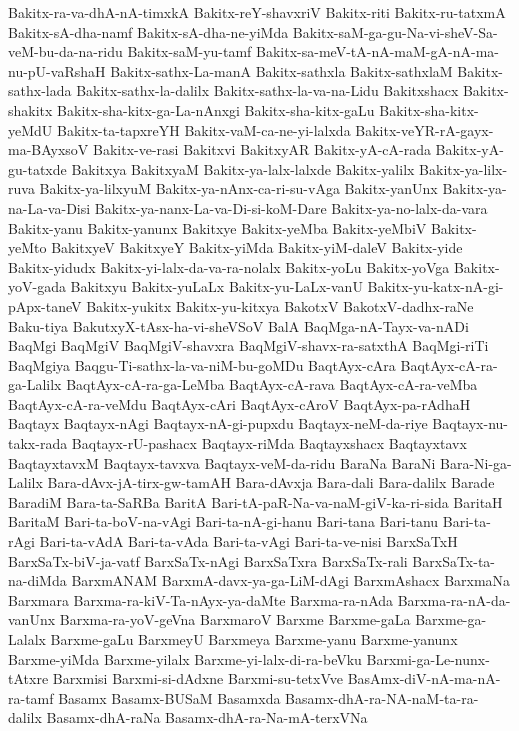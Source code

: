 {Bakitx-ra-va-dhA-nA-timxkA
Bakitx-reY-shavxriV
Bakitx-riti
Bakitx-ru-tatxmA
Bakitx-sA-dha-namf
Bakitx-sA-dha-ne-yiMda
Bakitx-saM-ga-gu-Na-vi-sheV-Sa-veM-bu-da-na-ridu
Bakitx-saM-yu-tamf
Bakitx-sa-meV-tA-nA-maM-gA-nA-ma-nu-pU-vaRshaH
Bakitx-sathx-La-manA
Bakitx-sathxla
Bakitx-sathxlaM
Bakitx-sathx-lada
Bakitx-sathx-la-dalilx
Bakitx-sathx-la-va-na-Lidu
Bakitxshacx
Bakitx-shakitx
Bakitx-sha-kitx-ga-La-nAnxgi
Bakitx-sha-kitx-gaLu
Bakitx-sha-kitx-yeMdU
Bakitx-ta-tapxreYH
Bakitx-vaM-ca-ne-yi-lalxda
Bakitx-veYR-rA-gayx-ma-BAyxsoV
Bakitx-ve-rasi
Bakitxvi
BakitxyAR
Bakitx-yA-cA-rada
Bakitx-yA-gu-tatxde
Bakitxya
BakitxyaM
Bakitx-ya-lalx-lalxde
Bakitx-yalilx
Bakitx-ya-lilx-ruva
Bakitx-ya-lilxyuM
Bakitx-ya-nAnx-ca-ri-su-vAga
Bakitx-yanUnx
Bakitx-ya-na-La-va-Disi
Bakitx-ya-nanx-La-va-Di-si-koM-Dare
Bakitx-ya-no-lalx-da-vara
Bakitx-yanu
Bakitx-yanunx
Bakitxye
Bakitx-yeMba
Bakitx-yeMbiV
Bakitx-yeMto
BakitxyeV
BakitxyeY
Bakitx-yiMda
Bakitx-yiM-daleV
Bakitx-yide
Bakitx-yidudx
Bakitx-yi-lalx-da-va-ra-nolalx
Bakitx-yoLu
Bakitx-yoVga
Bakitx-yoV-gada
Bakitxyu
Bakitx-yuLaLx
Bakitx-yu-LaLx-vanU
Bakitx-yu-katx-nA-gi-pApx-taneV
Bakitx-yukitx
Bakitx-yu-kitxya
BakotxV
BakotxV-dadhx-raNe
Baku-tiya
BakutxyX-tAsx-ha-vi-sheVSoV
BalA
BaqMga-nA-Tayx-va-nADi
BaqMgi
BaqMgiV
BaqMgiV-shavxra
BaqMgiV-shavx-ra-satxthA
BaqMgi-riTi
BaqMgiya
Baqgu-Ti-sathx-la-va-niM-bu-goMDu
BaqtAyx-cAra
BaqtAyx-cA-ra-ga-Lalilx
BaqtAyx-cA-ra-ga-LeMba
BaqtAyx-cA-rava
BaqtAyx-cA-ra-veMba
BaqtAyx-cA-ra-veMdu
BaqtAyx-cAri
BaqtAyx-cAroV
BaqtAyx-pa-rAdhaH
Baqtayx
Baqtayx-nAgi
Baqtayx-nA-gi-pupxdu
Baqtayx-neM-da-riye
Baqtayx-nu-takx-rada
Baqtayx-rU-pashacx
Baqtayx-riMda
Baqtayxshacx
Baqtayxtavx
BaqtayxtavxM
Baqtayx-tavxva
Baqtayx-veM-da-ridu
BaraNa
BaraNi
Bara-Ni-ga-Lalilx
Bara-dAvx-jA-tirx-gw-tamAH
Bara-dAvxja
Bara-dali
Bara-dalilx
Barade
BaradiM
Bara-ta-SaRBa
BaritA
Bari-tA-paR-Na-va-naM-giV-ka-ri-sida
BaritaH
BaritaM
Bari-ta-boV-na-vAgi
Bari-ta-nA-gi-hanu
Bari-tana
Bari-tanu
Bari-ta-rAgi
Bari-ta-vAdA
Bari-ta-vAda
Bari-ta-vAgi
Bari-ta-ve-nisi
BarxSaTxH
BarxSaTx-biV-ja-vatf
BarxSaTx-nAgi
BarxSaTxra
BarxSaTx-rali
BarxSaTx-ta-na-diMda
BarxmANAM
BarxmA-davx-ya-ga-LiM-dAgi
BarxmAshacx
BarxmaNa
Barxmara
Barxma-ra-kiV-Ta-nAyx-ya-daMte
Barxma-ra-nAda
Barxma-ra-nA-da-vanUnx
Barxma-ra-yoV-geVna
BarxmaroV
Barxme
Barxme-gaLa
Barxme-ga-Lalalx
Barxme-gaLu
BarxmeyU
Barxmeya
Barxme-yanu
Barxme-yanunx
Barxme-yiMda
Barxme-yilalx
Barxme-yi-lalx-di-ra-beVku
Barxmi-ga-Le-nunx-tAtxre
Barxmisi
Barxmi-si-dAdxne
Barxmi-su-tetxVve
BasAmx-diV-nA-ma-nA-ra-tamf
Basamx
Basamx-BUSaM
Basamxda
Basamx-dhA-ra-NA-naM-ta-ra-dalilx
Basamx-dhA-raNa
Basamx-dhA-ra-Na-mA-terxVNa
}
